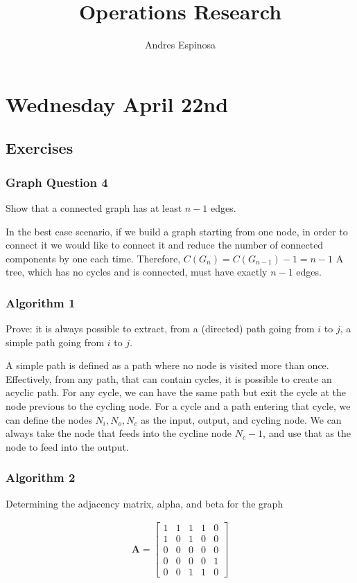 \documentclass[11pt]{article}
\title{Operations Research}
\author{Andres Espinosa}
\begin{document}
\pgfplotsset{compat=1.18}
\maketitle

\tableofcontents
\section{Wednesday April 22nd}
\subsection{Exercises}
\subsubsection{Graph Question 4}

Show that a connected graph has at least $n-1$ edges.

In the best case scenario, if we build a graph starting from one node, in order to connect it we would like to connect it and reduce the number of connected components by one each time.
Therefore, $C(G_{n}) = C(G_{n-1}) -1  = n - 1$
A tree, which has no cycles and is connected, must have exactly $n-1$ edges.

\subsubsection{Algorithm 1}
Prove: it is always possible to extract, from a (directed) path going from $i$ to $j$, a simple path going from $i$ to $j$.

A simple path is defined as a path where no node is visited more than once.
Effectively, from any path, that can contain cycles, it is possible to create an acyclic path.
For any cycle, we can have the same path but exit the cycle at the node previous to the cycling node.
For a cycle and a path entering that cycle, we can define the nodes $N_i, N_o, N_c$ as the input, output, and cycling node.
We can always take the node that feeds into the cycline node $N_c-1$, and use that as the node to feed into the output.

\subsubsection{Algorithm 2}
Determining the adjacency matrix, alpha, and beta for the graph

\begin{align}
  \textbf{A} = 
  \begin{bmatrix}
     1 & 1 & 1 & 1 & 0 \\
     1 & 0 & 1 & 0 & 0 \\
     0 & 0 & 0 & 0 & 0 \\
     0 & 0 & 0 & 0 & 1 \\
     0 & 0 & 1 & 1 & 0
  \end{bmatrix}
\end{align}
\end{document}
